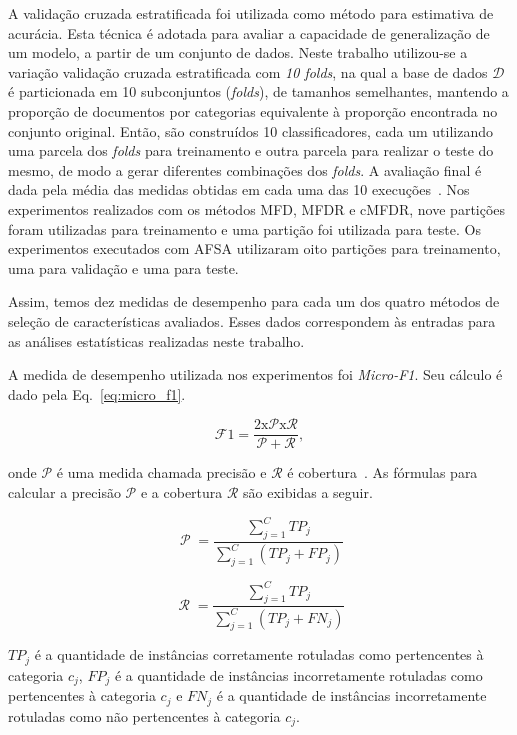 \documentclass[conference]{IEEEtran}
\begin{document}
A validação cruzada estratificada foi utilizada como método para estimativa de acurácia. Esta técnica é adotada para avaliar a capacidade de generalização de um modelo, a partir de um conjunto de dados. Neste trabalho utilizou-se a variação validação cruzada estratificada com \emph{10 folds}, na qual a base de dados $\mathcal{D}$ é particionada em 10 subconjuntos (\emph{folds}), de tamanhos semelhantes, mantendo a proporção de documentos por categorias equivalente à proporção encontrada no conjunto original. Então, são construídos 10 classificadores, cada um utilizando uma parcela dos \emph{folds} para treinamento e outra parcela para realizar o teste do mesmo, de modo a gerar diferentes combinações dos \emph{folds}. A avaliação final é dada pela média das medidas obtidas em cada uma das 10 execuções~\cite{kohavi1995study}. Nos experimentos realizados com os métodos MFD, MFDR e cMFDR, nove partições foram utilizadas para treinamento e uma partição foi utilizada para teste. Os experimentos executados com AFSA utilizaram oito partições para treinamento, uma para validação e uma para teste.

Assim, temos dez medidas de desempenho para cada um dos quatro métodos de seleção de características avaliados. Esses dados correspondem às entradas para as análises estatísticas realizadas neste trabalho.

A medida de desempenho utilizada nos experimentos foi \textit{Micro-F1}. Seu cálculo é dado pela Eq.~\ref{eq:micro_f1}.

\begin{equation}
\operatorname{\mathcal{F}{1} = \frac{2 x \mathcal{P} x \mathcal{R}}{\mathcal{P} + \mathcal{R}}},
\label{eq:micro_f1}
\end{equation}

\noindent onde $\mathcal{P}$ é uma medida chamada precisão e $\mathcal{R}$ é cobertura~\cite{chang2008multilabel}. As fórmulas para calcular a precisão $\mathcal{P}$ e a cobertura $\mathcal{R}$ são exibidas a seguir.

\begin{equation}
\operatorname{\mathcal{P}} = \frac{\sum_{j=1}^{C}TP_j}{\sum_{j=1}^{C}(TP_j + FP_j)}
\label{eq:precision}
\end{equation}

\begin{equation}
\operatorname{\mathcal{R}} = \frac{\sum_{j=1}^{C}TP_j}{\sum_{j=1}^{C}(TP_j + FN_j)}
\label{eq:recall}
\end{equation}

$TP_j$ é a quantidade de instâncias corretamente rotuladas como pertencentes à categoria $c_j$, $FP_j$ é a quantidade de instâncias incorretamente rotuladas como pertencentes à categoria $c_j$ e $FN_j$ é a quantidade de instâncias incorretamente rotuladas como não pertencentes à categoria $c_j$. 
\end{document}
